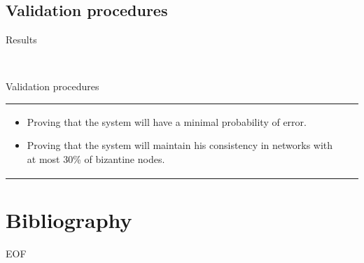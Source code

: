 \documentclass[12pt]{beamer}
\renewcommand{\frametitle}[1]{\vspace{0.2cm}\begin{huge}#1\end{huge}}
\renewcommand{\framesubtitle}[1]{\\ \vspace{0.4cm} \hspace{0.4cm}\begin{large}#1\end{large}}
\begin{document}
  \subsection{Validation procedures}
    \begin{frame}
    \frametitle{Results}
    \framesubtitle{Validation procedures}
    \begin{table}
    \begin{tabular}{p{7cm}p{3cm}}
      \begin{itemize}
          \item Proving that the system will have a minimal probability of error.
          \item Proving that the system will  maintain his consistency in networks with at most 30\% of bizantine nodes. 
      \end{itemize}
    &
    \vspace{1.5cm}
    \end{tabular}
    \end{table}
    \end{frame}

  \section{Bibliography}
\frame
{
	\vspace{2cm}
	\begin{center}
		\Large{EOF}
	\end{center}
}
\end{document}
